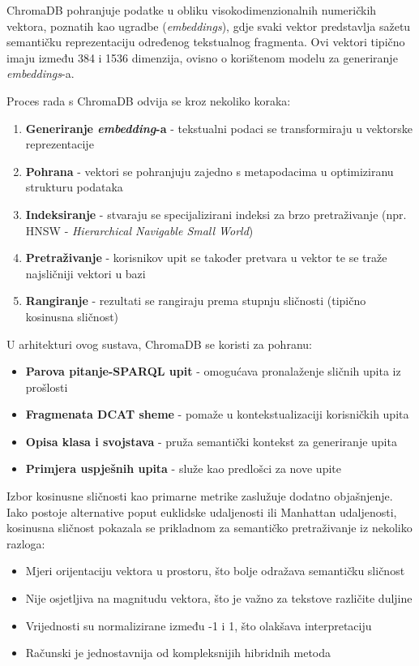 ChromaDB pohranjuje podatke u obliku visokodimenzionalnih numeričkih vektora, poznatih kao ugradbe (\textit{embeddings}), gdje svaki vektor predstavlja sažetu semantičku reprezentaciju određenog tekstualnog fragmenta. Ovi vektori tipično imaju između 384 i 1536 dimenzija, ovisno o korištenom modelu za generiranje \textit{embeddings}-a.

Proces rada s ChromaDB odvija se kroz nekoliko koraka:

\begin{enumerate}
    \item \textbf{Generiranje \textit{embedding}-a} - tekstualni podaci se transformiraju u vektorske reprezentacije
    \item \textbf{Pohrana} - vektori se pohranjuju zajedno s metapodacima u optimiziranu strukturu podataka
    \item \textbf{Indeksiranje} - stvaraju se specijalizirani indeksi za brzo pretraživanje (npr. HNSW - \textit{Hierarchical Navigable Small World})
    \item \textbf{Pretraživanje} - korisnikov upit se također pretvara u vektor te se traže najsličniji vektori u bazi
    \item \textbf{Rangiranje} - rezultati se rangiraju prema stupnju sličnosti (tipično kosinusna sličnost)
\end{enumerate}

U arhitekturi ovog sustava, ChromaDB se koristi za pohranu:

\begin{itemize}
    \item \textbf{Parova pitanje-SPARQL upit} - omogućava pronalaženje sličnih upita iz prošlosti
    \item \textbf{Fragmenata DCAT sheme} - pomaže u kontekstualizaciji korisničkih upita
    \item \textbf{Opisa klasa i svojstava} - pruža semantički kontekst za generiranje upita
    \item \textbf{Primjera uspješnih upita} - služe kao predlošci za nove upite
\end{itemize}

Izbor kosinusne sličnosti kao primarne metrike zaslužuje dodatno objašnjenje. Iako postoje alternative poput euklidske udaljenosti ili Manhattan udaljenosti, kosinusna sličnost pokazala se prikladnom za semantičko pretraživanje iz nekoliko razloga:

\begin{itemize}
    \item Mjeri orijentaciju vektora u prostoru, što bolje odražava semantičku sličnost
    \item Nije osjetljiva na magnitudu vektora, što je važno za tekstove različite duljine
    \item Vrijednosti su normalizirane između -1 i 1, što olakšava interpretaciju
    \item Računski je jednostavnija od kompleksnijih hibridnih metoda
\end{itemize}

